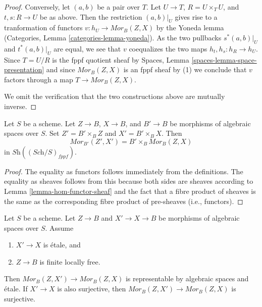 \begin{proof}
\medskip\noindent
Conversely, let $(a, b)$ be a pair over $T$. 
Let $U \to T$, $R = U \times_T U$, and $t, s : R \to U$ be as
above. Then the restriction $(a, b)|_U$ gives rise to a
tranformation of functors $v : h_U \to \mathit{Mor}_B(Z, X)$ by the
Yoneda lemma
(Categories, Lemma \ref{categories-lemma-yoneda}).
As the two pullbacks $s^*(a, b)|_U$ and $t^*(a, b)|_U$
are equal, we see that $v$ coequalizes the two maps
$h_t, h_s : h_R \to h_U$. Since $T = U/R$ is the fppf quotient sheaf by
Spaces, Lemma \ref{spaces-lemma-space-presentation}
and since $\mathit{Mor}_B(Z, X)$ is an fppf sheaf by (1) we conclude
that $v$ factors through a map $T \to \mathit{Mor}_B(Z, X)$.

\medskip\noindent
We omit the verification that the two constructions above are mutually
inverse.
\end{proof}

\begin{lemma}
\label{lemma-base-change-hom-functor}
Let $S$ be a scheme. Let $Z \to B$, $X \to B$, and $B' \to B$
be morphisms of algebraic spaces over $S$. Set $Z' = B' \times_B Z$
and $X' = B' \times_B X$. Then
$$
\mathit{Mor}_{B'}(Z', X')
=
B' \times_B \mathit{Mor}_B(Z, X)
$$
in $\textit{Sh}((\textit{Sch}/S)_{fppf})$.
\end{lemma}

\begin{proof}
The equality as functors follows immediately from the definitions.
The equality as sheaves follows from this because both sides are
sheaves according to
Lemma \ref{lemma-hom-functor-sheaf}
and the fact that a fibre product of sheaves is the same as the
corresponding fibre product of pre-sheaves (i.e., functors).
\end{proof}

\begin{lemma}
\label{lemma-etale-covering-hom-functor}
Let $S$ be a scheme. Let $Z \to B$ and $X' \to X \to B$ be morphisms of
algebraic spaces over $S$. Assume
\begin{enumerate}
\item $X' \to X$ is \'etale, and
\item $Z \to B$ is finite locally free.
\end{enumerate}
Then $\mathit{Mor}_B(Z, X') \to \mathit{Mor}_B(Z, X)$ is representable
by algebraic spaces and \'etale. If $X' \to X$ is also surjective,
then $\mathit{Mor}_B(Z, X') \to \mathit{Mor}_B(Z, X)$ is surjective.
\end{lemma}

